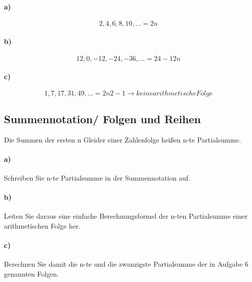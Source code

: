 \documentclass[paper=a4, fontsize=11pt]{scrartcl}
\numberwithin{equation}{section}
\numberwithin{figure}{section}
\numberwithin{table}{section}
\begin{document}
\paragraph{a)}
$$2,4,6,8,10,... = 2n$$
\paragraph{b)}
$$12,0,-12,-24,-36,... = 24-12n$$
\paragraph{c)}
$$1,7,17,31,49,... = 2n{2}-1 \rightarrow keine arithmetische Folge$$
\subsection{Summennotation/ Folgen und Reihen}
Die Summen der ersten n Gleider einer Zahlenfolge heißen n-te Partialsumme.
\paragraph{a)}
Schreiben Sie n-te Partialsumme in der Summennotation auf.

\paragraph{b)}
Leiten Sie daraus eine einfache Berechnungsformel der n-ten Partialsumme einer arithmetischen Folge her.

\paragraph{c)}
Berechnen Sie damit die n-te und die zwanzigste Partialsumme der in Aufgabe 6 genannten Folgen.

\end{document}
